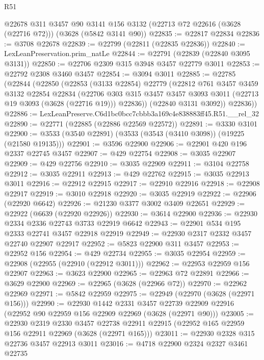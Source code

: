 \begin{lexlean}{R51}
\begin{coremodule}
    @22678
    @311
    @3457
    @90
    @3141
    @156
    @3132
    (@22713 @72 @22616 (@3628 (@22716 @72)))
    (@3628 (@5842 @3141 @90))
@22835 := @22817 @22834
@22836 := @3708 @22678
@22839 := @22799 (@22811 (@22835 @22836))
@22840 := LexLeanPreservation.prim_natLe
@22844 := @22791 (@22839 (@22840 @3095 @3131))
@22850 := @22706 @2309 @315 @3948 @3457 @22779 @3011
@22853 := @22792 @2308 @3460 @3457
@22854 := @3094 @3011
@22885 := @22785
    (@22844
      (@22850
        (@22853
          (@3133 @22854)
          @22779
          (@22812
            @761
            @3457
            @3459
            @3132
            @22854
            @22834
            (@22706
              @303
              @315
              @3457
              @3457
              @3093
              @3011
              (@22713 @19 @3093 (@3628 (@22716 @19)))
              @22836))
          (@22840 @3131 @3092))
        @22836))
@22886 := LexLeanPreserve.C6d1bc0bcc7cbbb3a169c4e838883ff45.R51.__rel_32
@22890 := @22771 (@22885 (@22886 @22569 @22572))
@22891 := @3330 @3101
@22900 := @3533 (@3540 @22891) (@3533 (@3543 (@3410 @3098)) (@19225 (@21580 @19135)))
@22901 := @3596 @22900
@22906 := @22901 @420 @196 @2337 @22745 @3457
@22907 := @429 @22754
@22908 := @3035 @22907
@22909 := @429 @22756
@22910 := @3035 @22909
@22911 := @3104 @22758
@22912 := @3035 @22911
@22913 := @429 @22762
@22915 := @3035 @22913 @3011
@22916 := @22912 @22915
@22917 := @22910 @22916
@22918 := @22908 @22917
@22919 := @3010 @22918
@22920 := @3035 @22919
@22922 := @22906 (@22920 @6642)
@22926 := @21230 @3377 @3002 @3409 @22651
@22929 := @22922 (@6639 (@22920 @22926))
@22930 := @3614 @22900
@22936 := @22930 @2334 @2336 @22743 @3733 @22919 @6642
@22943 := @22901 @534 @195 @2333 @22741 @3457 @22918 @22919
@22949 := @22930 @2317 @2332 @3457 @22740 @22907 @22917
@22952 := @5823 @22900 @311 @3457
@22953 := @22952 @156
@22954 := @429 @22734
@22955 := @3035 @22954
@22959 := @22908 (@22955 (@22910 (@22912 @3011)))
@22962 := @22953 @22959 @156 @22907
@22963 := @3623 @22900
@22965 := @22963 @72 @22891
@22966 := @3629 @22900
@22969 := @22965 (@3628 (@22966 @72))
@22970 := @22962 @22969
@22971 := @5842 @22959
@22975 := @22949 (@22970 (@3628 (@22971 @156)))
@22990 := @22930
    @1442
    @2331
    @3457
    @22739
    @22909
    @22916
    (@22952 @90 @22959 @156 @22909 @22969 (@3628 (@22971 @90)))
@23005 := @22930
    @2319
    @2330
    @3457
    @22738
    @22911
    @22915
    (@22952 @165 @22959 @156 @22911 @22969 (@3628 (@22971 @165)))
@23011 := @22930 @2328 @315 @22736 @3457 @22913 @3011
@23016 := @4718 @22900 @2324 @2327 @3461 @22735

\end{coremodule}
\end{lexlean}
